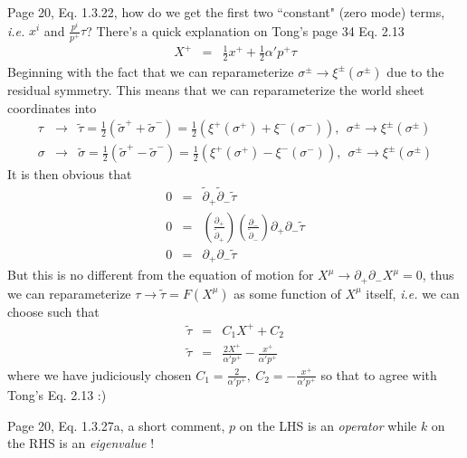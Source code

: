 \documentclass[aps,preprint,preprintnumbers,nofootinbib,showpacs,prd]{revtex4-1}
\newcommand{\ie}{{\it i.e.} }
\newcommand{\nbea}{\begin{eqnarray*}}
\newcommand{\neea}{\end{eqnarray*}}
\begin{document}
Page 20, Eq. 1.3.22, how do we get the first two ``constant" (zero mode) terms, \ie $x^i$ and $\frac{p^i}{p^+}\tau$? There's a quick explanation on Tong's page 34 Eq. 2.13
%
\nbea
X^+ & = & \frac{1}{2} x^+ + \frac{1}{2} \alpha' p^+ \tau
\neea
%
Beginning with the fact that we can reparameterize $\sigma^\pm \rightarrow \xi^\pm(\sigma^\pm)$ due to the residual symmetry. This means that we can reparameterize the world sheet coordinates into
%
\nbea
\tau & \rightarrow & \tilde \tau = \frac{1}{2} (\tilde \sigma^+ + \tilde \sigma^-) = \frac{1}{2} (\xi^+(\sigma^+) + \xi^-(\sigma^-)), ~~\sigma^\pm \rightarrow \xi^\pm(\sigma^\pm) \\
\sigma & \rightarrow & \tilde \sigma = \frac{1}{2} (\tilde \sigma^+ - \tilde \sigma^-) = \frac{1}{2} (\xi^+(\sigma^+) - \xi^-(\sigma^-)), ~~\sigma^\pm \rightarrow \xi^\pm(\sigma^\pm)
\neea
%
It is then obvious that
%
\nbea
0 & = & \tilde \partial_+\tilde \partial_- \tilde\tau \\
0 & = & \left ( \frac {\partial_+}{\tilde \partial_+} \right ) \left ( \frac {\partial_-}{\tilde \partial_-} \right ) \partial_+ \partial_- \tilde\tau \\
0 & = & \partial_+ \partial_- \tilde\tau 
\neea
%
But this is no different from the equation of motion for $X^\mu \rightarrow \partial_+\partial_-X^\mu = 0$, thus we can reparameterize $\tau \rightarrow \tilde \tau = F(X^\mu)$ as some function of $X^\mu$ itself, \ie we can choose such that
%
\nbea
\tilde \tau & = & C_1 X^+ + C_2 \\
\tilde\tau & = & \frac{2 X^+}{\alpha' p^+} - \frac{x^+}{\alpha'p^+}
\neea
%
where we have judiciously chosen $C_1 = \frac{2}{\alpha' p^+},~C_2 = - \frac{x^+}{\alpha'p^+}$ so that to agree with Tong's Eq. 2.13 :)

Page 20, Eq. 1.3.27a, a short comment, $p$ on the LHS is an {\it operator} while $k$ on the RHS is an {\it eigenvalue} !
\end{document}
